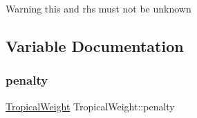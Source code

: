 \begin{DoxyWarning}{Warning}
this and rhs must not be unknown 
\end{DoxyWarning}


\subsection{Variable Documentation}
\mbox{\label{group__weight_ga65ae4a5dbff3b9bf3d9972147868fc05}} 
\subsubsection{\texorpdfstring{penalty}{penalty}}
{\footnotesize\ttfamily \mbox{\hyperlink{classTropicalWeight}{Tropical\+Weight}} Tropical\+Weight\+::penalty\hspace{0.3cm}{\ttfamily [static]}}

